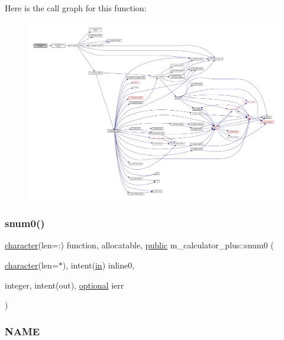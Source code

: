 Here is the call graph for this function\+:
\nopagebreak
\begin{figure}[H]
\begin{center}
\leavevmode
\includegraphics[width=350pt]{namespacem__calculator__plus_a448c42e7171e27c1f4a8e339687b0e3f_cgraph}
\end{center}
\end{figure}
\mbox{\label{namespacem__calculator__plus_a2538e7f9f0b810f7f8dbdd80fa2444b3}} 
\subsubsection{\texorpdfstring{snum0()}{snum0()}}
{\footnotesize\ttfamily \hyperlink{option__stopwatch_83_8txt_abd4b21fbbd175834027b5224bfe97e66}{character}(len=\+:) function, allocatable, \hyperlink{M__stopwatch_83_8txt_a2f74811300c361e53b430611a7d1769f}{public} m\+\_\+calculator\+\_\+plus\+::snum0 (\begin{DoxyParamCaption}\item[{\hyperlink{option__stopwatch_83_8txt_abd4b21fbbd175834027b5224bfe97e66}{character}(len=$\ast$), intent(\hyperlink{M__journal_83_8txt_afce72651d1eed785a2132bee863b2f38}{in})}]{inline0,  }\item[{integer, intent(out), \hyperlink{option__stopwatch_83_8txt_aa4ece75e7acf58a4843f70fe18c3ade5}{optional}}]{ierr }\end{DoxyParamCaption})}



\subsubsection*{N\+A\+ME}

